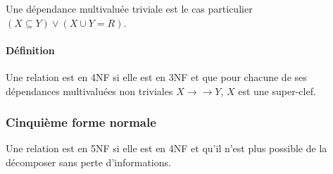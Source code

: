 \documentclass[a4paper]{article}
\begin{document}
Une dépendance multivaluée triviale est le cas particulier $(X \subseteq Y) \lor (X \cup Y = R)$.

\paragraph{Définition}
Une relation est en 4NF si elle est en 3NF et que pour chacune de ses
dépendances multivaluées non triviales $X \rightarrow\rightarrow Y$, $X$ est
une super-clef.

\subsubsection{Cinquième forme normale}
Une relation est en 5NF si elle est en 4NF et qu'il n'est plus possible de la
décomposer sans perte d'informations.
\end{document}
